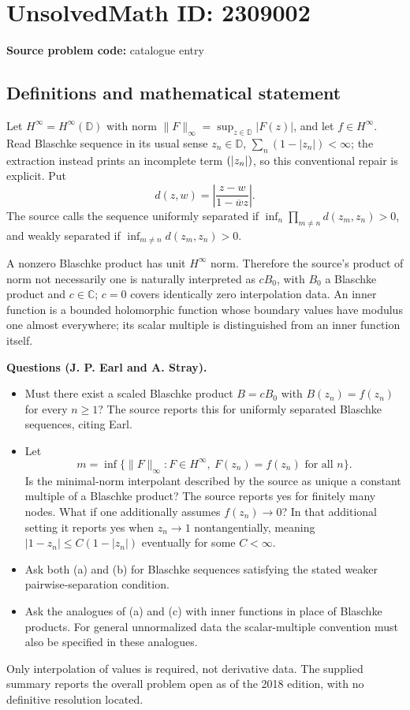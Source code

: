 \documentclass[11pt]{article}
\begin{document}
\section*{UnsolvedMath ID: 2309002}
\textbf{Source problem code:} catalogue entry
\subsection{Definitions and mathematical statement}
Let $H^\infty=H^\infty(\mathbb D)$ with norm $\|F\|_\infty=\sup_{z\in\mathbb D}|F(z)|$, and let $f\in H^\infty$. Read Blaschke sequence in its usual sense $z_n\in\mathbb D$, $\sum_n(1-|z_n|)<\infty$; the extraction instead prints an incomplete term $(\-|z_n|)$, so this conventional repair is explicit. Put
\[
d(z,w)=\left|\frac{z-w}{1-\overline w z}\right|.
\]
The source calls the sequence uniformly separated if $\inf_n\prod_{m\ne n}d(z_m,z_n)>0$, and weakly separated if $\inf_{m\ne n}d(z_m,z_n)>0$.

A nonzero Blaschke product has unit $H^\infty$ norm. Therefore the source's product of norm not necessarily one is naturally interpreted as $cB_0$, with $B_0$ a Blaschke product and $c\in\mathbb C$; $c=0$ covers identically zero interpolation data. An inner function is a bounded holomorphic function whose boundary values have modulus one almost everywhere; its scalar multiple is distinguished from an inner function itself.

\textbf{Questions (J. P. Earl and A. Stray).}
\begin{itemize}
\item[(a)] Must there exist a scaled Blaschke product $B=cB_0$ with $B(z_n)=f(z_n)$ for every $n\geq1$? The source reports this for uniformly separated Blaschke sequences, citing Earl.
\item[(b)] Let
\[
m=\inf\{\|F\|_\infty:F\in H^\infty,\ F(z_n)=f(z_n)\text{ for all }n\}.
\]
Is the minimal-norm interpolant described by the source as unique a constant multiple of a Blaschke product? The source reports yes for finitely many nodes. What if one additionally assumes $f(z_n)\to0$? In that additional setting it reports yes when $z_n\to1$ nontangentially, meaning $|1-z_n|\leq C(1-|z_n|)$ eventually for some $C<\infty$.
\item[(c)] Ask both (a) and (b) for Blaschke sequences satisfying the stated weaker pairwise-separation condition.
\item[(d)] Ask the analogues of (a) and (c) with inner functions in place of Blaschke products. For general unnormalized data the scalar-multiple convention must also be specified in these analogues.
\end{itemize}
Only interpolation of values is required, not derivative data. The supplied summary reports the overall problem open as of the 2018 edition, with no definitive resolution located.
\end{document}
